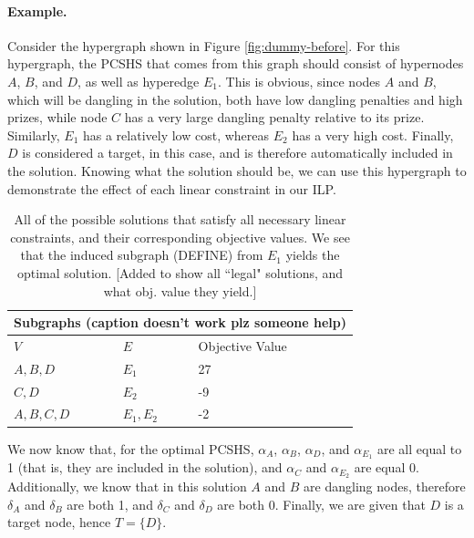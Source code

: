 \documentclass[12pt,twoside]{reedthesis}
\newcommand{\new}[2]{{\color{red}#1 [#2]}}
\theoremstyle{definition}
\begin{document}
\paragraph{Example.}Consider the hypergraph shown in Figure \ref{fig:dummy-before}. For this hypergraph, the PCSHS that comes from this graph should consist of hypernodes $A$, $B$, and $D$, as well as hyperedge $E_1$. This is obvious, since nodes $A$ and $B$, which will be dangling in the solution, both have low dangling penalties and high prizes, while node $C$ has a very large dangling penalty relative to its prize. Similarly, $E_1$ has a relatively low cost, whereas $E_2$ has a very high cost. Finally, $D$ is considered a target, in this case, and is therefore automatically included in the solution. Knowing what the solution should be, we can use this hypergraph to demonstrate the effect of each linear constraint in our ILP.\par

\begin{table}[!h]
\begin{center}
  \label{tab:obj_values_dummy}
  \caption[Objective values of dummy hypergraph.]{\new{All of the possible solutions that satisfy all necessary linear constraints, and their corresponding objective values. We see that the induced subgraph (DEFINE) from $E_1$ yields the optimal solution.}{Added to show all ``legal" solutions, and what obj. value they yield.}}
\begin{tabular}{ |l|l|l| }%
  \hline%
  \multicolumn{3}{|c|}{Subgraphs (caption doesn't work plz someone help)} \\%
  \hline \hline
  $V$ & $E$ & Objective Value \\ \hline%
  $A,B,D$ & $E_1$ & 27 \\ \hline%
  $C,D$ & $E_2$ & -9 \\ \hline%
  $A,B,C,D$ & $E_1,E_2$ & -2 \\ \hline%
\end{tabular}%
\end{center}
\end{table}

We now know that, for the optimal PCSHS, $\alpha_A$, $\alpha_B$, $\alpha_D$, and $\alpha_{E_1}$ are all equal to 1 (that is, they are included in the solution), and $\alpha_C$ and $\alpha_{E_2}$ are equal 0. Additionally, we know that in this solution $A$ and $B$ are dangling nodes, therefore $\delta_A$ and $\delta_B$ are both 1, and $\delta_C$ and $\delta_D$ are both 0. Finally, we are given that $D$ is a target node, hence $T=\{D\}$.\par
\end{document}
